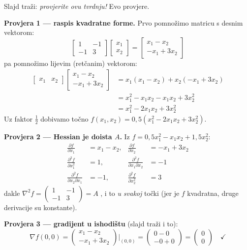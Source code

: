 Slajd traži: \emph{provjerite ovu tvrdnju!} Evo provjere.

\textbf{Provjera 1 --- raspis kvadratne forme.} Prvo pomnožimo matricu s
desnim vektorom:
\[
\begin{bmatrix} 1 & -1 \\ -1 & 3\end{bmatrix}
\begin{bmatrix} x_1 \\ x_2 \end{bmatrix}
= \begin{bmatrix} x_1 - x_2 \\ -x_1 + 3x_2 \end{bmatrix}
\]
pa pomnožimo lijevim (retčanim) vektorom:
\begin{align}
\begin{bmatrix} x_1 & x_2\end{bmatrix}
\begin{bmatrix} x_1 - x_2 \\ -x_1 + 3x_2\end{bmatrix}
&= x_1(x_1 - x_2) + x_2(-x_1 + 3x_2) \\
&= x_1^2 - x_1x_2 - x_1x_2 + 3x_2^2 \\
&= x_1^2 - 2x_1x_2 + 3x_2^2
\end{align}
Uz faktor $\tfrac12$ dobivamo točno $f(x_1,x_2) = 0{,}5(x_1^2 - 2x_1x_2 +
3x_2^2)$. \checkmark

\textbf{Provjera 2 --- Hessian je doista $A$.} Iz
$f = 0{,}5x_1^2 - x_1x_2 + 1{,}5x_2^2$:
\begin{align}
\frac{\partial f}{\partial x_1} &= x_1 - x_2, &
\frac{\partial f}{\partial x_2} &= -x_1 + 3x_2 \\
\frac{\partial^2 f}{\partial x_1^2} &= 1, &
\frac{\partial^2 f}{\partial x_1\partial x_2} &= -1 \\
\frac{\partial^2 f}{\partial x_2\partial x_1} &= -1, &
\frac{\partial^2 f}{\partial x_2^2} &= 3
\end{align}
dakle $\nabla^2 f = \begin{pmatrix} 1 & -1 \\ -1 & 3\end{pmatrix} = A$
\checkmark, i to \emph{u svakoj} točki (jer je $f$ kvadratna, druge derivacije
su konstante).

\textbf{Provjera 3 --- gradijent u ishodištu} (slajd traži i to):
\[
\nabla f(0,0) = \begin{pmatrix} x_1 - x_2 \\ -x_1 + 3x_2\end{pmatrix}
\bigg|_{(0,0)}
= \begin{pmatrix} 0 - 0 \\ -0 + 0\end{pmatrix}
= \begin{pmatrix} 0 \\ 0\end{pmatrix} \quad\checkmark
\]

